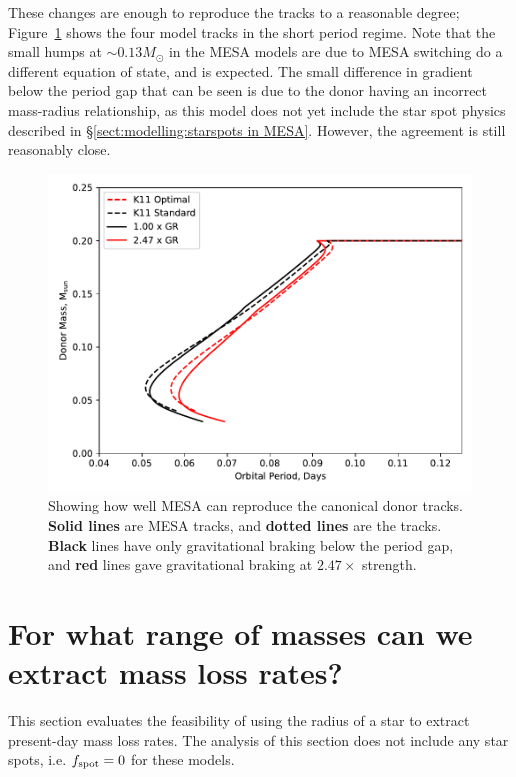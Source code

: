 These changes are enough to reproduce the \citet{knigge11} tracks to a reasonable degree; Figure~\ref{fig:results:MESA can reproduce the K11 tracks} shows the four model tracks in the short period regime. Note that the small humps at $\sim 0.13 M_\odot$ in the MESA models are due to MESA switching do a different equation of state, and is expected.
The small difference in gradient below the period gap that can be seen is due to the donor having an incorrect mass-radius relationship, as this model does not yet include the star spot physics described in \S\ref{sect:modelling:starspots in MESA}. However, the agreement is still reasonably close.

\begin{figure}
    \centering
    \includegraphics[width=.9\textwidth]{figures/modelling/reproducing_K11_tracks_fspot0.000.pdf}
    \caption{Showing how well MESA can reproduce the canonical \citet{knigge11} donor tracks. {\bf Solid lines} are MESA tracks, and {\bf dotted lines} are the \citet{knigge11} tracks. {\bf Black} lines have only gravitational braking below the period gap, and {\bf red} lines gave gravitational braking at $2.47\times$ strength.}
    \label{fig:results:MESA can reproduce the K11 tracks}
\end{figure}



\section{For what range of masses can we extract mass loss rates?}
\label{sect:results:MESA massloss allowable mass range}

This section evaluates the feasibility of using the radius of a star to extract present-day mass loss rates.
The analysis of this section does not include any star spots, i.e. $f_{\rm spot} = 0$ for these models.

